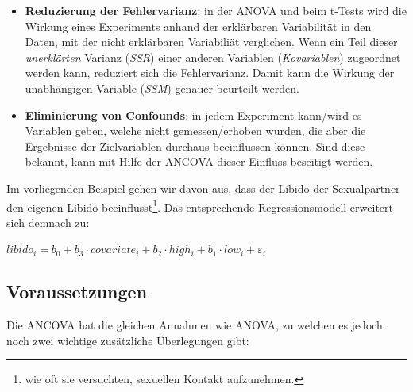 \documentclass[]{article}
\let\rmarkdownfootnote\footnote%
\def\footnote{\protect\rmarkdownfootnote}
\begin{document}
\begin{itemize}
\item
  \textbf{Reduzierung der Fehlervarianz}: in der ANOVA und beim t-Tests
  wird die Wirkung eines Experiments anhand der erklärbaren Variabilität
  in den Daten, mit der nicht erklärbaren Variabiliät verglichen. Wenn
  ein Teil dieser \emph{unerklärten} Varianz (\emph{SSR}) einer anderen
  Variablen (\emph{Kovariablen}) zugeordnet werden kann, reduziert sich
  die Fehlervarianz. Damit kann die Wirkung der unabhängigen Variable
  (\emph{SSM}) genauer beurteilt werden.
\item
  \textbf{Eliminierung von Confounds}: in jedem Experiment kann/wird es
  Variablen geben, welche nicht gemessen/erhoben wurden, die aber die
  Ergebnisse der Zielvariablen durchaus beeinflussen können. Sind diese
  bekannt, kann mit Hilfe der ANCOVA dieser Einfluss beseitigt werden.
\end{itemize}

Im vorliegenden Beispiel gehen wir davon aus, dass der Libido der
Sexualpartner den eigenen Libido beeinflusst\footnote{wie oft sie
  versuchten, sexuellen Kontakt aufzunehmen.}. Das entsprechende
Regressionsmodell erweitert sich demnach zu:

\(libido_i = b_0 + b_3 \cdot covariate_i + b_2 \cdot high_i + b_1 \cdot low_i + \varepsilon_i\)

\subsection*{Voraussetzungen}\label{voraussetzungen}

Die ANCOVA hat die gleichen Annahmen wie ANOVA, zu welchen es jedoch
noch zwei wichtige zusätzliche Überlegungen gibt:
\end{document}
